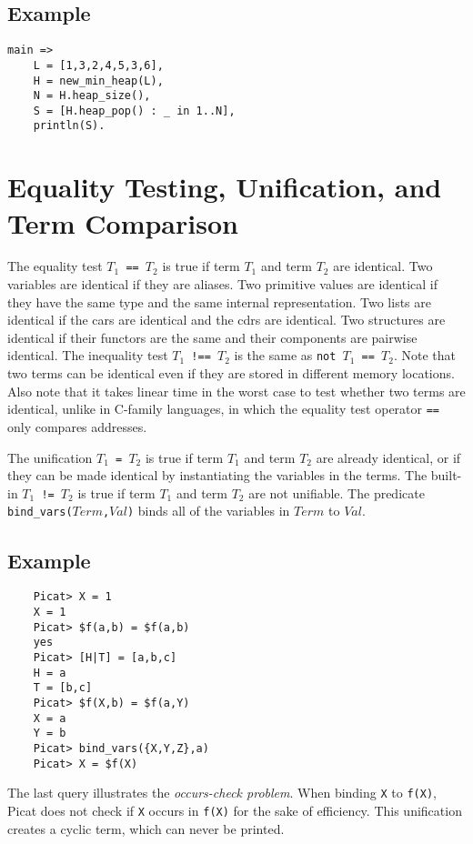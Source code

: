 \subsection*{Example}
\begin{verbatim}
main =>
    L = [1,3,2,4,5,3,6],
    H = new_min_heap(L),
    N = H.heap_size(),
    S = [H.heap_pop() : _ in 1..N],
    println(S).
\end{verbatim}

\section{\label{sec:unification}Equality Testing, Unification, and Term Comparison}
The equality test \texttt{$T_1$ == $T_2$}  is true if term $T_1$ and term $T_2$ are identical. Two variables are identical if they are aliases. Two primitive values are identical if they have the same type and the same internal representation. Two lists are identical if the cars are identical and the cdrs are identical. Two structures are identical if their functors are the same and their components are pairwise identical. The inequality test \texttt{$T_1$ !== $T_2$} is the same as \texttt{not $T_1$ == $T_2$}.  Note that two terms can be identical even if they are stored in different memory locations.  Also note that it takes linear time in the worst case to test whether two terms are identical, unlike in C-family languages, in which the equality test operator \texttt{==} only compares addresses.

The unification \texttt{$T_1$ = $T_2$}  is true if term $T_1$ and term $T_2$ are already identical, or if they can be made identical by instantiating the variables in the terms. The built-in \texttt{$T_1$ != $T_2$} is true if term $T_1$ and term $T_2$ are not unifiable. The predicate \texttt{bind\_vars($Term$,$Val$)} binds all of the variables in $Term$ to $Val$.

\subsection*{Example}
\begin{verbatim}
    Picat> X = 1
    X = 1
    Picat> $f(a,b) = $f(a,b)
    yes
    Picat> [H|T] = [a,b,c]
    H = a
    T = [b,c]
    Picat> $f(X,b) = $f(a,Y)
    X = a
    Y = b
    Picat> bind_vars({X,Y,Z},a)
    Picat> X = $f(X)
\end{verbatim}
The last query illustrates the \emph{occurs-check problem}. When binding \texttt{X} to \texttt{f(X)}, Picat does not check if \texttt{X} occurs in \texttt{f(X)} for the sake of efficiency. This unification creates a cyclic term, which can never be printed.

